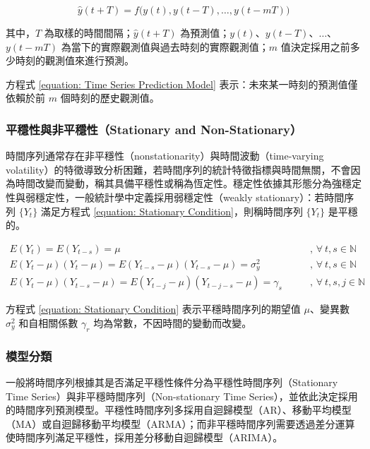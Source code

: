 \begin{equation}\label{equation: Time Series Prediction Model}
  \hat{y} (t + T) = f\Big( y(t), y(t - T), \dots, y(t - mT) \Big)
\end{equation}

其中，$T$ 為取樣的時間間隔；$\hat{y}(t + T)$ 為預測值；$y(t)$、$y(t - T)$、$\dots$、$y(t - mT)$ 為當下的實際觀測值與過去時刻的實際觀測值；$m$ 值決定採用之前多少時刻的觀測值來進行預測。

方程式 \eqref{equation: Time Series Prediction Model} 表示：未來某一時刻的預測值僅依賴於前 $m$ 個時刻的歷史觀測值。

\subsubsection{平穩性與非平穩性（Stationary and Non-Stationary）}

時間序列通常存在非平穩性（nonstationarity）與時間波動（time-varying volatility）的特徵導致分析困難，若時間序列的統計特徵指標與時間無關，不會因為時間改變而變動，稱其具備平穩性或稱為恆定性。穩定性依據其形態分為強穩定性與弱穩定性，一般統計學中定義採用弱穩定性（weakly stationary）：若時間序列 $\{ Y_t \}$ 滿足方程式 \eqref{equation: Stationary Condition}，則稱時間序列 $\{ Y_t \}$ 是平穩的。

\begin{subequations}\label{equation: Stationary Condition}
  \begin{alignat}{2}
    E(Y_t) = E(Y_{t - s}) = \mu                                                  \qquad & \text{, } \forall~t, s \in \mathbb{N} \\
    E(Y_t - \mu)(Y_t - \mu) = E(Y_{t-s} - \mu)(Y_{t-s} - \mu) = \sigma_{y}^{2}   \qquad & \text{, } \forall~t, s \in \mathbb{N} \\
    E(Y_t - \mu)(Y_{t-s} - \mu) = E(Y_{t-j} - \mu)(Y_{t-j-s} - \mu) = \gamma_{s} \qquad & \text{, } \forall~t, s, j \in \mathbb{N}
  \end{alignat}
\end{subequations}

方程式 \eqref{equation: Stationary Condition} 表示平穩時間序列的期望值 $\mu$、變異數 $\sigma_{y}^{2}$ 和自相關係數 $\gamma_r$ 均為常數，不因時間的變動而改變。

\subsubsection{模型分類}

一般將時間序列根據其是否滿足平穩性條件分為平穩性時間序列（Stationary Time Series）與非平穩時間序列（Non-stationary Time Series），並依此決定採用的時間序列預測模型。平穩性時間序列多採用自迴歸模型（AR）、移動平均模型（MA）或自迴歸移動平均模型（ARMA）；而非平穩時間序列需要透過差分運算使時間序列滿足平穩性，採用差分移動自迴歸模型（ARIMA）。


